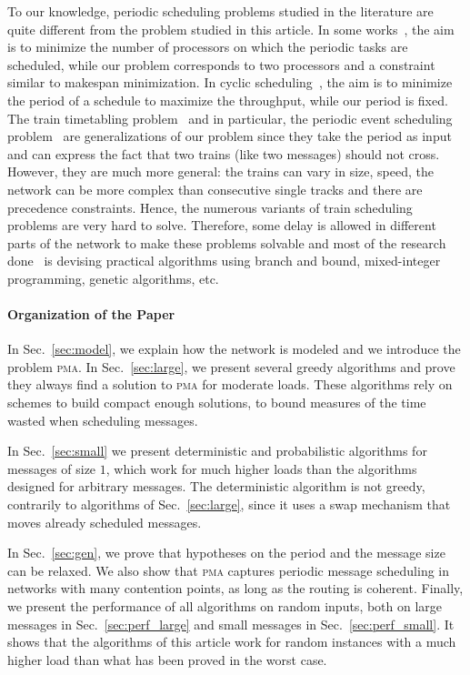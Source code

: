 \documentclass[a4paper,UKenglish,cleveref, autoref, thm-restate]{lipics-v2019}
\newcommand\pma{\textsc{pma}\xspace}
\begin{document}
 To our knowledge, periodic scheduling problems studied in the literature are quite different from the problem studied in this article. In some works~\cite{korst1991periodic,hanen1993cyclic}, the aim is to minimize the number of processors on which the periodic tasks are scheduled, while our problem corresponds to two processors and a constraint similar to makespan minimization. In cyclic scheduling~\cite{levner2010complexity}, the aim is to minimize the period of a schedule to maximize the throughput, while our period is fixed. The train timetabling problem~\cite{lusby2011railway} and in particular, the periodic event scheduling problem~\cite{serafini1989mathematical} are generalizations of our problem since they take the period as input and can express the fact that two trains (like two messages) should not cross. However, they are much more general: the trains can vary in size, speed, the network can be more complex than consecutive single tracks and there are precedence constraints. Hence, the numerous variants of train scheduling problems are very hard to solve. Therefore, some delay is allowed in different parts of the network to make these problems solvable and most of the research done~\cite{lusby2011railway} is devising practical algorithms using branch and bound, mixed-integer programming, genetic algorithms, etc. 
 

\paragraph*{Organization of the Paper}

In Sec.~\ref{sec:model}, we explain how the network is modeled and we introduce the problem \pma. In Sec.~\ref{sec:large}, we present several greedy algorithms and prove they always find a solution to \pma for moderate loads. 
These algorithms rely on schemes to build compact enough solutions, to bound measures of the time wasted when scheduling messages. 

In Sec.~\ref{sec:small} we present deterministic and probabilistic algorithms for messages of size $1$, which work for much higher loads than the algorithms designed for arbitrary messages. The deterministic algorithm is not greedy, contrarily to algorithms of Sec.~\ref{sec:large}, since it uses a swap mechanism that moves already scheduled messages. 

In Sec.~\ref{sec:gen}, we prove that hypotheses on the period and the message size can be relaxed. We also show that \pma captures periodic message scheduling in networks with many contention points, as long as the routing is coherent.
Finally, we present the performance of all algorithms on random inputs, both on large messages in Sec.~\ref{sec:perf_large} and small messages in Sec.~\ref{sec:perf_small}.
It shows that the algorithms of this article work for random instances with a much higher load than what has been proved in the worst case.
\end{document}
